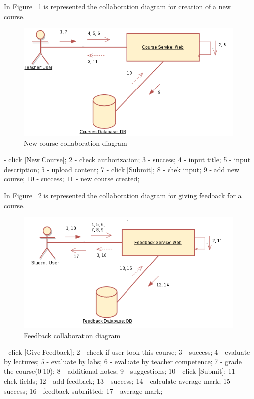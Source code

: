 \documentclass[12pt,a4paper,titlepage]{article}
\begin{document}
In Figure ~\ref{fig:create} is represented the collaboration diagram for creation of a new course.
\begin{figure}[H]
	\includegraphics[width=\textwidth]{create}
	\caption{New course collaboration diagram}
	\centering
	\label{fig:create}
\end{figure}
 - click [New Course];
 2 - check authorization;
 3 - success;
 4 - input title;
 5 - input description;
 6 - upload content;
 7 - click [Submit];
 8 - chek input;
 9 - add new course;
10 - success;
11 - new course created;

In Figure ~\ref{fig:feedback} is represented the collaboration diagram for giving feedback for a course.
\begin{figure}[H]
\includegraphics[width=\textwidth]{feedback}
\caption{Feedback collaboration diagram}
\centering
\label{fig:feedback}
\end{figure}
 - click [Give Feedback];
 2 - check if user took this course;
 3 - success;
 4 - evaluate by lectures;
 5 - evaluate by labs;
 6 - evaluate by teacher competence;
 7 - grade the course(0-10);
 8 - additional notes;
 9 - suggestions;
10 - click [Submit];
11 - chek fields;
12 - add feedback;
13 - success;
14 - calculate average mark;
15 - success;
16 - feedback submitted;
17 - average mark;
\end{document}
